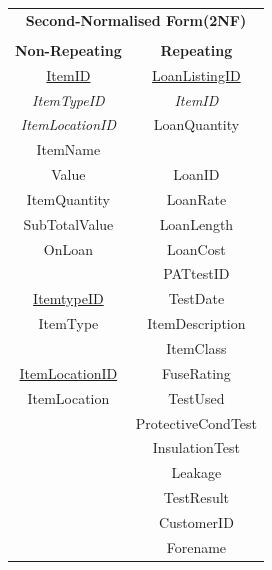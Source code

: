 \begin{center}
    \begin{tabular}{|c|c|}
        \hline
        \multicolumn{2}{|c|}{\textbf{Second-Normalised Form(2NF)}} \\
        \multicolumn{2}{|c|}{ }                                    \\ \hline
        \textbf{Non-Repeating}     & \textbf{Repeating}            \\ \hline
        \underline{ItemID}         & \underline{LoanListingID}     \\
        \emph{ItemTypeID}          & \emph{ItemID}                 \\
        \emph{ItemLocationID}      & LoanQuantity                  \\
        ItemName                   &                               \\
        Value                      & LoanID                        \\
        ItemQuantity               & LoanRate                      \\
        SubTotalValue              & LoanLength                    \\          
        OnLoan                     & LoanCost                      \\         
                                   & PATtestID                     \\ 
        \underline{ItemtypeID}     & TestDate                      \\ 
        ItemType                   & ItemDescription               \\ 
                                   & ItemClass                     \\ 
        \underline{ItemLocationID} & FuseRating                    \\ 
        ItemLocation               & TestUsed                      \\ 
                                   & ProtectiveCondTest            \\
                                   & InsulationTest                \\ 
                                   & Leakage                       \\
                                   & TestResult                    \\
                                   & CustomerID                    \\
                                   & Forename                      \\

\end{tabular}
\end{center}
